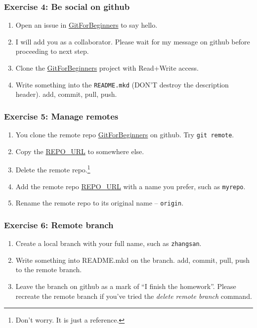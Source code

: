 \documentclass[11pt,ignorenonframetext,]{beamer}
\begin{document}
\begin{frame}[fragile]\frametitle{Exercise 4: Be social on github}

\begin{enumerate}[1.]
\item
  Open an issue in
  \href{https://github.com/weijianwen/GitForBeginners/issues}{GitForBeginners}
  to say hello.
\item
  I will add you as a collaborator. Please wait for my message on github
  before proceeding to next step.
\item
  Clone the
  \href{https://github.com/weijianwen/GitForBeginners}{GitForBeginners}
  project with Read+Write access.
\item
  Write something into the \texttt{README.mkd} (DON'T destroy the
  description header). add, commit, pull, push.
\end{enumerate}
\end{frame}

\begin{frame}[fragile]\frametitle{Exercise 5: Manage remotes}

\begin{enumerate}[1.]
\item
  You clone the remote repo
  \href{https://github.com/weijianwen/GitForBeginners}{GitForBeginners}
  on github. Try \texttt{git remote}.
\item
  Copy the
  \href{git@github.com:weijianwen/GitForBeginners.git}{REPO\_URL} to
  somewhere else.
\item
  Delete the remote repo.\footnote{Don't worry. It is just a reference.}
\item
  Add the remote repo
  \href{git@github.com:weijianwen/GitForBeginners.git}{REPO\_URL} with a
  name you prefer, such as \texttt{myrepo}.
\item
  Rename the remote repo to its original name -- \texttt{origin}.
\end{enumerate}
\end{frame}

\begin{frame}[fragile]\frametitle{Exercise 6: Remote branch}

\begin{enumerate}[1.]
\item
  Create a local branch with your full name, such as \texttt{zhangsan}.
\item
  Write something into README.mkd on the branch. add, commit, pull, push
  to the remote branch.
\item
  Leave the branch on github as a mark of ``I finish the homework''.
  Please recreate the remote branch if you've tried the \emph{delete
  remote branch} command.
\end{enumerate}
\end{frame}
\end{document}
